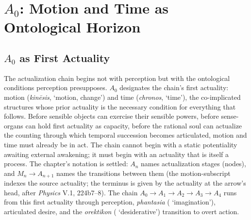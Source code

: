 \section{$A_0$: Motion and Time as Ontological Horizon}

\subsection{$A_0$ as First Actuality}

The actualization chain begins not with perception but with the ontological conditions perception presupposes. $A_0$ designates the chain's first actuality: motion (\textit{kinēsis},  `motion, change') and time (\textit{chronos},  `time'), the co-implicated structures whose prior actuality is the necessary condition for everything that follows. Before sensible objects can exercise their sensible powers, before sense-organs can hold first actuality as capacity, before the rational soul can actualize the counting through which temporal succession becomes articulated, motion and time must already be in act. The chain cannot begin with a static potentiality awaiting external awakening; it must begin with an actuality that is itself a process. The chapter's notation is settled: $A_n$ names actualization stages (nodes), and $M_n \rightarrow A_{n+1}$ names the transitions between them (the motion-subscript indexes the source actuality; the terminus is given by the actuality at the arrow's head, after \textit{Physics} V.1, 224b7--8). The chain $A_0 \rightarrow A_1 \rightarrow A_2 \rightarrow A_3 \rightarrow A_4$ runs from this first actuality through perception, \textit{phantasia} ( `imagination'), articulated desire, and the \textit{orektikon} ( `desiderative') transition to overt action.

